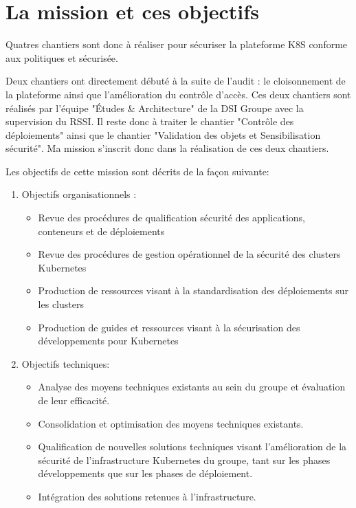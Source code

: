 \section{La mission et ces objectifs}

Quatres chantiers sont donc à réaliser pour sécuriser la plateforme \ac{K8S} conforme aux politiques et sécurisée.

Deux chantiers ont directement débuté à la suite de l'audit : le cloisonnement de la plateforme ainsi que l'amélioration
du contrôle d'accès. Ces deux chantiers sont réalisés par l'équipe "Études \& Architecture" de la \ac{DSI} Groupe avec
la supervision du \ac{RSSI}.
\newline Il reste donc à traiter le chantier "Contrôle des déploiements" ainsi que le chantier "Validation des objets et 
Sensibilisation sécurité". Ma mission s'inscrit donc dans la réalisation de ces deux chantiers.

Les objectifs de cette mission sont décrits de la façon suivante:
\begin{enumerate}
    \item Objectifs organisationnels : 
    \begin{itemize}
        \item Revue des procédures de qualification sécurité des applications, conteneurs et de déploiements
        \item Revue des procédures de gestion opérationnel de la sécurité des clusters Kubernetes
        \item Production de ressources visant à la standardisation des déploiements sur les clusters
        \item Production de guides et ressources visant à la sécurisation des développements pour Kubernetes
    \end{itemize}
    \item Objectifs techniques:
    \begin{itemize}
        \item Analyse des moyens techniques existants au sein du groupe et évaluation de leur efficacité.
        \item Consolidation et optimisation des moyens techniques existants.
        \item Qualification de nouvelles solutions techniques visant l’amélioration de la sécurité de l’infrastructure Kubernetes du  groupe, 
        tant sur les phases développements que sur les phases de déploiement.
        \item Intégration des solutions retenues à l’infrastructure. 
    \end{itemize}
\end{enumerate}


